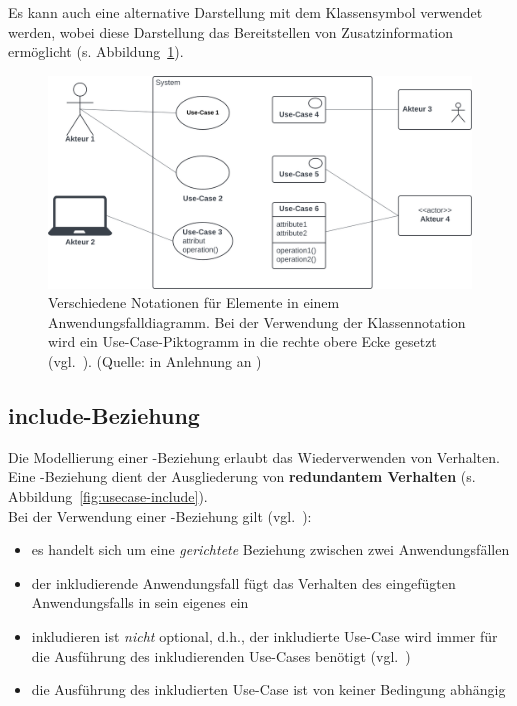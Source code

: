 \noindent
Es kann auch eine alternative Darstellung mit dem Klassensymbol verwendet werden, wobei diese Darstellung das Bereitstellen von Zusatzinformation ermöglicht (s. Abbildung~\ref{fig:usecase-notation}).


\begin{figure}
    \centering
    \includegraphics[scale=0.35]{part three/Anwendungsfalldiagramm/img/usecase-notation}
    \caption{Verschiedene Notationen für Elemente in einem Anwendungsfalldiagramm. Bei der Verwendung der Klassennotation wird ein Use-Case-Piktogramm in die rechte obere Ecke gesetzt (vgl.~\cite[63 f.]{Bal05}). (Quelle: in Anlehnung an \cite[64, Abb. 2.8-2]{Bal05})}
    \label{fig:usecase-notation}
\end{figure}


\subsection{include-Beziehung}

Die Modellierung einer -Beziehung erlaubt das Wiederverwenden von Verhalten.\\

\noindent
Eine -Beziehung dient der Ausgliederung von \textbf{redundantem Verhalten} (s. Abbildung~\ref{fig:usecase-include}).\\

\noindent
Bei der Verwendung einer -Beziehung gilt (vgl.~\cite[53]{Buh09}):


\begin{itemize}
    \item es handelt sich um eine \textit{gerichtete} Beziehung zwischen zwei Anwendungsfällen
    \item der inkludierende Anwendungsfall fügt das Verhalten des eingefügten Anwendungsfalls in sein eigenes ein
    \item inkludieren ist \textit{nicht} optional, d.h., der inkludierte Use-Case wird immer für die Ausführung des inkludierenden Use-Cases benötigt (vgl.~\cite[65 f.]{Bal05})
    \item die Ausführung des inkludierten Use-Case ist von keiner Bedingung abhängig
\end{itemize}

